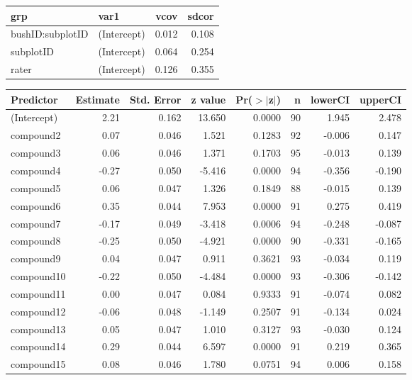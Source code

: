 \begin{table}[ht]
\centering
\begin{tabular}{|llrr|}
  \hline
grp & var1 & vcov & sdcor \\ 
  \hline
bushID:subplotID & (Intercept) & 0.012 & 0.108 \\ 
  subplotID & (Intercept) & 0.064 & 0.254 \\ 
  rater & (Intercept) & 0.126 & 0.355 \\ 
   \hline
\end{tabular}
\begin{tabular}{|lrrrrrrr|}
  \hline
Predictor & Estimate & Std. Error & z value & Pr($>$$|$z$|$) & n & lowerCI & upperCI \\ 
  \hline
(Intercept) & 2.21 & 0.162 & 13.650 & 0.0000 & 90 & 1.945 & 2.478 \\ 
  compound2 & 0.07 & 0.046 & 1.521 & 0.1283 & 92 & -0.006 & 0.147 \\ 
  compound3 & 0.06 & 0.046 & 1.371 & 0.1703 & 95 & -0.013 & 0.139 \\ 
  compound4 & -0.27 & 0.050 & -5.416 & 0.0000 & 94 & -0.356 & -0.190 \\ 
  compound5 & 0.06 & 0.047 & 1.326 & 0.1849 & 88 & -0.015 & 0.139 \\ 
  compound6 & 0.35 & 0.044 & 7.953 & 0.0000 & 91 & 0.275 & 0.419 \\ 
  compound7 & -0.17 & 0.049 & -3.418 & 0.0006 & 94 & -0.248 & -0.087 \\ 
  compound8 & -0.25 & 0.050 & -4.921 & 0.0000 & 90 & -0.331 & -0.165 \\ 
  compound9 & 0.04 & 0.047 & 0.911 & 0.3621 & 93 & -0.034 & 0.119 \\ 
  compound10 & -0.22 & 0.050 & -4.484 & 0.0000 & 93 & -0.306 & -0.142 \\ 
  compound11 & 0.00 & 0.047 & 0.084 & 0.9333 & 91 & -0.074 & 0.082 \\ 
  compound12 & -0.06 & 0.048 & -1.149 & 0.2507 & 91 & -0.134 & 0.024 \\ 
  compound13 & 0.05 & 0.047 & 1.010 & 0.3127 & 93 & -0.030 & 0.124 \\ 
  compound14 & 0.29 & 0.044 & 6.597 & 0.0000 & 91 & 0.219 & 0.365 \\ 
  compound15 & 0.08 & 0.046 & 1.780 & 0.0751 & 94 & 0.006 & 0.158 \\ 
   \hline
\end{tabular}
\end{table}
